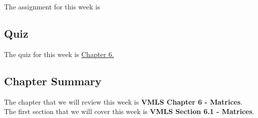 The assignment for this week is   

\subsection{Quiz}

The quiz for this week is \href{https://applied.cs.colorado.edu/mod/quiz/view.php?id=50739}{Chapter 6.}  

\subsection{Chapter Summary}

The chapter that we will review this week is \textbf{VMLS Chapter 6 - Matrices}. The first section that we will cover this week is \textbf{VMLS Section 6.1 - Matrices}.

